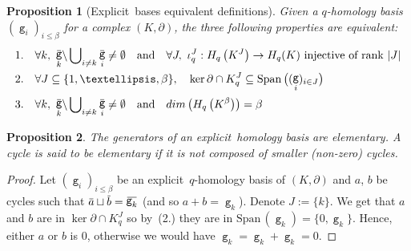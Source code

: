 \documentclass[10pt,a4paper]{amsart}
\newtheorem{proposition}{Proposition}
\newcommand{\Explicit}{Explicit}
\newcommand\Span{\mathrm{Span}\,}
\newcommand{\bs}{\backslash}
\newcommand{\cplx}{{(K,\partial)} }
\newcommand{\dr}{\partial}
\newcommand{\explicit}{explicit}
\DeclareMathOperator{\g}{\mathtt{g}}
\newcommand{\ols}[1]{\mskip.5\thinmuskip\overline{\mskip-.5\thinmuskip {#1} \mskip-.5\thinmuskip}\mskip.5\thinmuskip} %
\newcommand{\tx}[1]{\text{#1}}
\begin{document}
    \begin{proposition}[\Explicit\ bases equivalent definitions]\label{prop_explicit-bases-equivalence}
        Given a $q$-homology basis $(\g_i)_{i\leq\beta}$ for a complex $\cplx$, the three following properties are equivalent:
        \begin{align*}
        1.\quad & \forall k,\ \ols{\g_k}\bs\bigcup\nolimits_{i \neq k} \ols{\g_i} \neq \emptyset \quad \tx{and}\quad
         \forall J,\ \iota_q^J: H_q\left(K^J\right) \to H_q(K) \ \tx{injective of rank $|J|$}\\
        2.\quad & \forall J\subseteq \{1, \dots, \beta\}, \quad
        \ker\dr \cap K^J_q \subseteq \Span\big((\g_i)_{i\in J}\big)\\
        3.\quad & \forall k,\ \ols{\g_k}\bs\bigcup\nolimits_{i \neq k} \ols{\g_i} \neq \emptyset \quad \tx{and}\quad
        dim \left( H_q\left(K^{\beta}\right) \right) = \beta
        \end{align*}
    \end{proposition}

    \begin{proposition}\label{prop_elementary-generators}
        The generators of an \explicit\ homology basis are \emph{elementary}.
        A cycle is said to be \emph{elementary} if it is not composed of smaller (non-zero) cycles.
    \end{proposition}

    \begin{proof}
Let $(\g_i)_{i\leq \beta}$ be an \explicit\ $q$-homology basis of $(K,\dr)$ and $a$, $b$ be cycles such that $\ols{a}\sqcup \ols{b} = \ols{\g_k}$ (and so $a+b = \g_k$).
Denote $J := \{k\}$.
We get that $a$ and $b$ are in $\ker\dr \cap K^J_q$ so by~(2.) they are in $\Span(\g_k) = \{0, \g_k\}$.
Hence, either $a$ or $b$ is $0$, otherwise we would have $\g_k = \g_k + \g_k = 0$.
    \end{proof}
\end{document}
